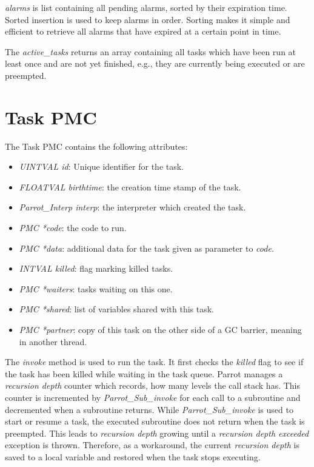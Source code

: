 \documentclass[bachelor,english]{hgbthesis}
\begin{document}
\textit{alarms} is list containing all pending alarms, sorted by their expiration time. Sorted insertion is used to keep alarms in order. Sorting makes it simple and efficient to retrieve all alarms that have expired at a certain point in time.

The \textit{active\_tasks} returns an array containing all tasks which have been run at least once and are not yet finished, e.g., they are currently being executed or are preempted.

\section{Task PMC}

The Task PMC contains the following attributes:
%
\begin{itemize}
\item \textit{UINTVAL id}: Unique identifier for the task.
\item \textit{FLOATVAL birthtime}: the creation time stamp of the task.
\item \textit{Parrot\_Interp interp}: the interpreter which created the task.
\item \textit{PMC *code}: the code to run.
\item \textit{PMC *data}: additional data for the task given as parameter to \textit{code}.
\item \textit{INTVAL killed}: flag marking killed tasks.
\item \textit{PMC *waiters}: tasks waiting on this one.
\item \textit{PMC *shared}: list of variables shared with this task.
\item \textit{PMC *partner}: copy of this task on the other side of a GC barrier, meaning in another thread.
\end{itemize}

The \textit{invoke} method is used to run the task. It first checks the \textit{killed} flag to see if the task has been killed while waiting in the task queue. Parrot manages a \textit{recursion depth} counter which records, how many levels the call stack has. This counter is incremented by \textit{Parrot\_Sub\_invoke} for each call to a subroutine and decremented when a subroutine returns. While \textit{Parrot\_Sub\_invoke} is used to start or resume a task, the executed subroutine does not return when the task is preempted. This leads to \textit{recursion depth} growing until a \textit{recursion depth exceeded} exception is thrown. Therefore, as a workaround, the current \textit{recursion depth} is saved to a local variable and restored when the task stops executing.
\end{document}

